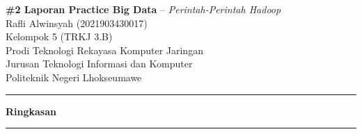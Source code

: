 \documentclass[a4paper,12pt]{article}
\renewenvironment{abstract}				%
 {\par\noindent\textbf{Ringkasan}\ \ignorespaces \\}
 {\par\noindent\medskip}
\begin{document}
\pagestyle{fancy}
\thispagestyle{empty}
\fancyhead[L]{}
\renewcommand*{\thefootnote}{\fnsymbol{footnote}}

\begin{center}
\Large{\textbf{\#2 Laporan Practice Big Data} -- \textit{Perintah-Perintah Hadoop}}
\vspace{0.4cm}
\normalsize \\ 
Rafli Alwinsyah (2021903430017) \\
Kelompok 5 (TRKJ 3.B) \\
\vspace{0.1cm}
\small{Prodi Teknologi Rekayasa Komputer Jaringan} \\
\small{Jurusan Teknologi Informasi dan Komputer} \\
\small{Politeknik Negeri Lhokseumawe}
\medskip
\normalsize
\end{center}

{\color{gray}\hrule}
\vspace{0.4cm}
\begin{abstract} 								%

\end{abstract}
{\color{gray}\hrule}
\medskip

\end{document}
